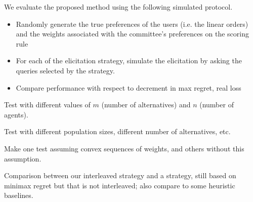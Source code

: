 \documentclass[12pt]{article}
\begin{document}
We evaluate the proposed method using the following simulated protocol.

\begin{itemize}
 \item Randomly generate the true preferences of the users (i.e. the linear orders) and the weights associated with the committee's preferences on the scoring rule
 \item For each of the elicitation strategy, simulate the elicitation by asking the queries selected by the strategy.
 
 \item Compare performance with respect to decrement in max regret, real loss
\end{itemize}


Test with different values of $m$ (number of alternatives) and $n$ (number of agents).

Test with different population sizes, different number of alternatives, etc.

Make one test assuming convex sequences of weights, and others without this assumption.

Comparison between our interleaved strategy and a strategy, still based on minimax regret  but that is not interleaved; also compare to some heuristic baselines.


 

\pagebreak
\appendix
\end{document}

